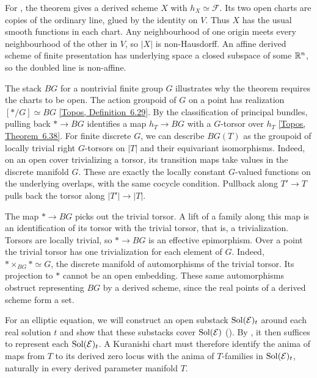 For , the theorem gives a derived scheme $X$
with $h_X\simeq\mathcal F$. Its two open charts are copies of the
ordinary line, glued by the identity on $V$. Thus $X$ has the usual
smooth functions in each chart. Any neighbourhood of one origin meets
every neighbourhood of the other in $V$, so $|X|$ is non-Hausdorff.
An affine derived scheme of finite presentation has underlying space
a closed subspace of some $\mathbb{R}^n$, so the doubled line is non-affine.

The stack $BG$ for a nontrivial finite group $G$ illustrates why the
theorem requires the charts to be open.
The action groupoid of $G$ on a point has realization $[*/G]\simeq BG$
\href{https://animarium.org/tag/0295/}{[Topos, Definition~6.29]}.
By the classification of principal bundles, pulling back $*\to BG$
identifies a map $h_T\to BG$ with a $G$-torsor over $h_T$
\href{https://animarium.org/tag/029E/}{[Topos, Theorem~6.38]}.
For finite discrete $G$, we can describe $BG(T)$ as the groupoid of
locally trivial right $G$-torsors on $|T|$ and their equivariant
isomorphisms. Indeed, on an open cover trivializing a torsor, its
transition maps take values in the discrete manifold $G$. These are
exactly the locally constant $G$-valued functions on the underlying
overlaps, with the same cocycle condition. Pullback along $T'\to T$
pulls back the torsor along $|T'|\to|T|$.

The map $*\to BG$ picks out the trivial torsor. A lift of a family
along this map is an identification of its torsor with the
trivial torsor, that is, a trivialization. Torsors are locally
trivial, so $*\to BG$ is an effective epimorphism. Over a point the
trivial torsor has one trivialization for each element of $G$.
Indeed, $*\times_{BG}*\simeq G$, the discrete manifold of
automorphisms of the trivial torsor. Its projection to $*$ cannot be
an open embedding. These same automorphisms obstruct representing $BG$
by a derived scheme, since the real points of a derived scheme form a set.

For an elliptic equation, we will construct an open substack
$\operatorname{Sol}(\mathcal E)_t$ around each real solution $t$ and show that these
substacks cover $\operatorname{Sol}(\mathcal E)$
().
By , it then suffices to represent
each $\operatorname{Sol}(\mathcal E)_t$. A Kuranishi chart must therefore identify
the anima of maps from $T$ to its derived zero locus with the anima of
$T$-families in $\operatorname{Sol}(\mathcal E)_t$, naturally in every derived
parameter manifold $T$.


